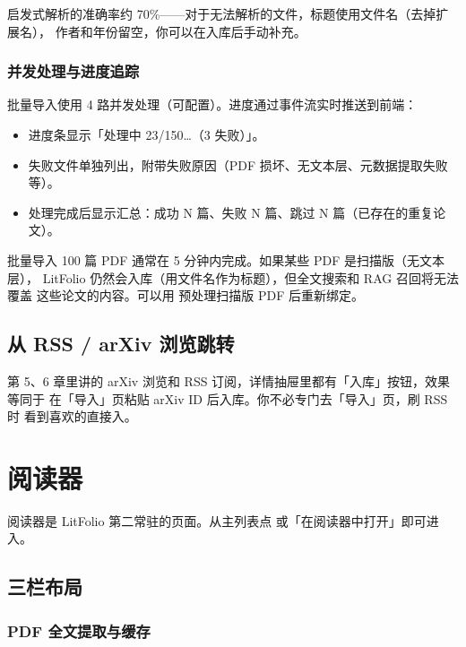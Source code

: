 启发式解析的准确率约 70\%——对于无法解析的文件，标题使用文件名（去掉扩展名），
作者和年份留空，你可以在入库后手动补充。

\subsection{并发处理与进度追踪}

批量导入使用 4 路并发处理（可配置）。进度通过事件流实时推送到前端：

\begin{itemize}
  \item 进度条显示「处理中 23/150…（3 失败）」。
  \item 失败文件单独列出，附带失败原因（PDF 损坏、无文本层、元数据提取失败等）。
  \item 处理完成后显示汇总：成功 N 篇、失败 N 篇、跳过 N 篇（已存在的重复论文）。
\end{itemize}

\begin{tipbox}
批量导入 100 篇 PDF 通常在 5 分钟内完成。如果某些 PDF 是扫描版（无文本层），
LitFolio 仍然会入库（用文件名作为标题），但全文搜索和 RAG 召回将无法覆盖
这些论文的内容。可以用  预处理扫描版 PDF 后重新绑定。
\end{tipbox}

\section{从 RSS / arXiv 浏览跳转}

第 5、6 章里讲的 arXiv 浏览和 RSS 订阅，详情抽屉里都有「入库」按钮，效果等同于
在「导入」页粘贴 arXiv ID 后入库。你不必专门去「导入」页，刷 RSS 时
看到喜欢的直接入。

\chapter{阅读器}
\label{ch:reader}

阅读器是 LitFolio 第二常驻的页面。从主列表点  或「在阅读器中打开」即可进入。

\section{三栏布局}
\subsection{PDF 全文提取与缓存}

